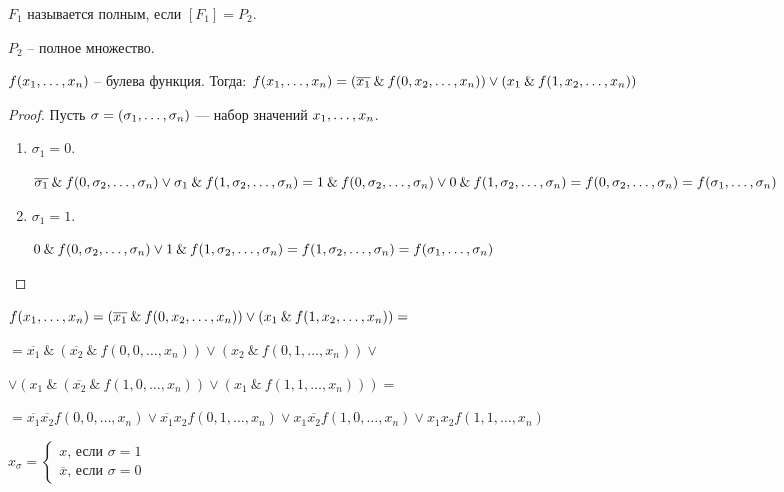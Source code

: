 \begin{definition}
	$F_1$ называется полным, если $[F_1] = P_2$.
\end{definition}

\begin{example}
	$P_2$ -- полное множество.
\end{example}

\begin{statement}
	$f(x_1, \ldots, x_n)$ -- булева функция. Тогда: $f(x_1, \ldots, x_n) = (\overline{x_1} \: \& \: f(0, x_2, \ldots, x_n)) \vee (x_1 \: \& \: f(1, x_2, \ldots , x_n))$
\end{statement}
\begin{proof}
	Пусть $\sigma = (\sigma_1, \ldots, \sigma_n) $ --- набор значений $x_1, \ldots, x_n$.
\begin{enumerate}
\item $\sigma_1 = 0$. 

$\overline{\sigma_1} \: \& \: f(0, \sigma_2, \ldots, \sigma_n) \vee \sigma_1 \: \& \: f(1, \sigma_2, \ldots, \sigma_n) = 1 \: \& \: f(0, \sigma_2, \ldots, \sigma_n) \vee 0 \: \& \: f(1, \sigma_2, \ldots, \sigma_n) = f(0, \sigma_2, \ldots, \sigma_n) = f(\sigma_1, \ldots, \sigma_n) $

\item $\sigma_1 = 1$.

$0 \: \& \: f(0, \sigma_2, \ldots, \sigma_n) \vee 1 \: \& \: f(1, \sigma_2, \ldots, \sigma_n) = f(1, \sigma_2, \ldots, \sigma_n) = f(\sigma_1, \ldots, \sigma_n) $
\end{enumerate}
\end{proof}

$
f(x_1, \ldots, x_n) = (\overline{x_1} \: \& \: f(0, x_2, \ldots, x_n)) \vee (x_1 \: \& \: f(1, x_2, \ldots , x_n)) = $

$= \overline{x_1} \: \& \: (\overline{x_2} \: \& \: f(0, 0, \ldots, x_n)) \vee (x_2 \: \& \: f(0, 1, \ldots , x_n)) \vee $

$ \vee (x_1 \: \& \: (\overline{x_2} \: \& \: f(1, 0, \ldots, x_n)) \vee (x_1 \: \& \: f(1, 1, \ldots , x_n))) =$

$
= \overline{x_1}\overline{x_2}f(0, 0, \ldots, x_n) \vee \overline{x_1} x_2 f(0, 1, \ldots, x_n) \vee x_1 \overline{x_2}f(1, 0, \ldots, x_n) \vee x_1 x_2 f(1, 1, \ldots, x_n)
$

\begin{definition}
	$x_\sigma = \begin{cases} x \text{, если }\sigma = 1 \\ \overline{x} \text{, если }\sigma = 0 \end{cases}$
\end{definition}


